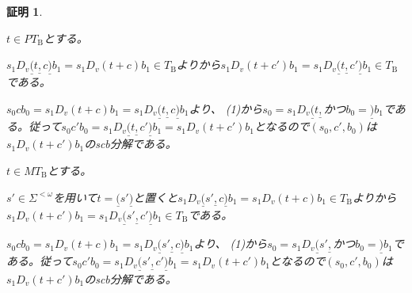 \documentclass[dvipdfmx,uplatex]{jsarticle}
\theoremstyle{customnonumberbreakfortheorem}
\theoremstyle{customnonumberbreakforproof}
\newtheorem{hideableproof}{証明}
\begin{document}
\begin{hideableproof}
\begin{indented}
\begin{indented}
		\end{indented}
		\item \(t \in PT_{\textrm{B}}\)とする。
		\begin{indented}
			\item \(s_1 D_v \underline{(} t \underline{,} c \underline{)} b_1 = s_1 D_v(t+c) b_1 \in T_{\textrm{B}}\)よりから\(s_1 D_v(t+c') b_1 = s_1 D_v \underline{(} t \underline{,} c' \underline{)} b_1 \in T_{\textrm{B}}\)である。
			\item \(s_0 c b_0 = s_1 D_v(t+c) b_1 = s_1 D_v \underline{(} t \underline{,} c \underline{)} b_1\)より、 (1)から\(s_0 = s_1 D_v \underline{(} t \underline{,}\)かつ\(b_0 = \underline{)} b_1\)である。従って\(s_0 c' b_0 = s_1 D_v \underline{(} t \underline{,} c' \underline{)} b_1 = s_1 D_v(t+c') b_1\)となるので\((s_0,c',b_0)\)は\(s_1 D_v(t+c') b_1\)のscb分解である。
		\end{indented}
		\item \(t \in MT_{\textrm{B}}\)とする。
		\begin{indented}
			\item \(s' \in \Sigma^{< \omega}\)を用いて\(t = \underline{(} s' \underline{)}\)と置くと\(s_1 D_v \underline{(} s' \underline{,} c \underline{)} b_1 = s_1 D_v(t+c) b_1 \in T_{\textrm{B}}\)よりから\(s_1 D_v(t+c') b_1 = s_1 D_v \underline{(} s' \underline{,} c' \underline{)} b_1 \in T_{\textrm{B}}\)である。
			\item \(s_0 c b_0 = s_1 D_v(t+c) b_1 = s_1 D_v \underline{(} s' \underline{,} c \underline{)} b_1\)より、 (1)から\(s_0 = s_1 D_v \underline{(} s' \underline{,}\)かつ\(b_0 = \underline{)} b_1\)である。従って\(s_0 c' b_0 = s_1 D_v \underline{(} s' \underline{,} c' \underline{)} b_1 = s_1 D_v(t+c') b_1\)となるので\((s_0,c',b_0)\)は\(s_1 D_v(t+c') b_1\)のscb分解である。
		\end{indented}
	\end{indented}
\end{hideableproof}
\end{document}

